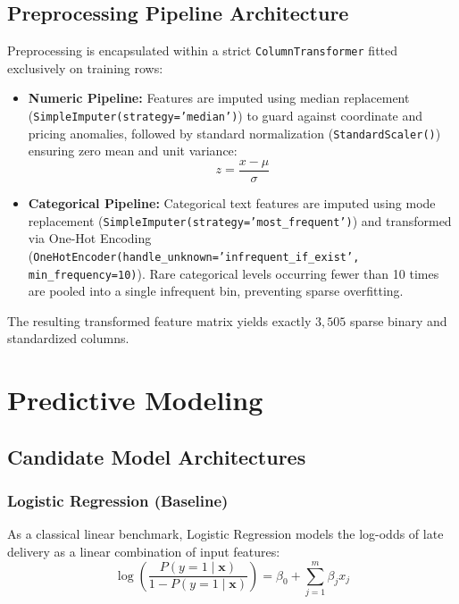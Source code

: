 \documentclass[journal,10pt,twocolumn]{IEEEtran}
\begin{document}
\subsection{Preprocessing Pipeline Architecture}
Preprocessing is encapsulated within a strict \texttt{ColumnTransformer} fitted exclusively on training rows:
\begin{itemize}
    \item \textbf{Numeric Pipeline:} Features are imputed using median replacement (\texttt{SimpleImputer(strategy='median')}) to guard against coordinate and pricing anomalies, followed by standard normalization (\texttt{StandardScaler()}) ensuring zero mean and unit variance:
    \begin{equation}
    z = \frac{x - \mu}{\sigma}
    \end{equation}
    \item \textbf{Categorical Pipeline:} Categorical text features are imputed using mode replacement (\texttt{SimpleImputer(strategy='most\_frequent')}) and transformed via One-Hot Encoding (\texttt{OneHotEncoder(handle\_unknown='infrequent\_if\_exist', min\_frequency=10)}). Rare categorical levels occurring fewer than 10 times are pooled into a single infrequent bin, preventing sparse overfitting.
\end{itemize}

The resulting transformed feature matrix yields exactly $3,505$ sparse binary and standardized columns.

\section{Predictive Modeling}
\label{sec:modeling}

\subsection{Candidate Model Architectures}

\subsubsection{Logistic Regression (Baseline)}
As a classical linear benchmark, Logistic Regression models the log-odds of late delivery as a linear combination of input features:
\begin{equation}
\log\left(\frac{P(y=1 \mid \mathbf{x})}{1 - P(y=1 \mid \mathbf{x})}\right) = \beta_0 + \sum_{j=1}^m \beta_j x_j
\label{eq:lr}
\end{equation}
\end{document}
